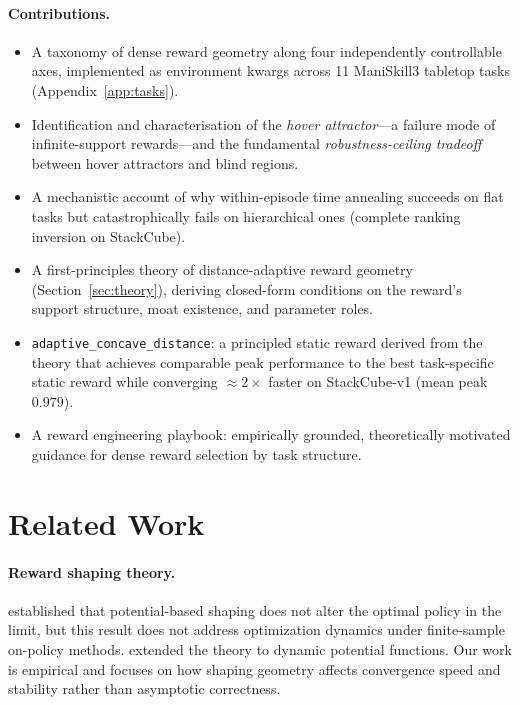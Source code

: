 \documentclass{article}
\begin{document}
\paragraph{Contributions.}
\begin{itemize}
    \item A taxonomy of dense reward geometry along four independently controllable
    axes, implemented as environment kwargs across 11 ManiSkill3 tabletop tasks
    (Appendix~\ref{app:tasks}).
    \item Identification and characterisation of the \emph{hover attractor}---a
    failure mode of infinite-support rewards---and the fundamental
    \emph{robustness-ceiling tradeoff} between hover attractors and blind regions.
    \item A mechanistic account of why within-episode time annealing succeeds on
    flat tasks but catastrophically fails on hierarchical ones (complete ranking
    inversion on StackCube).
    \item A first-principles theory of distance-adaptive reward geometry
    (Section~\ref{sec:theory}), deriving closed-form conditions on the
    reward's support structure, moat existence, and parameter roles.
    \item \texttt{adaptive\_concave\_distance}: a principled static reward derived
    from the theory that achieves comparable peak performance to the best
    task-specific static reward while converging $\approx\!2\times$ faster on
    StackCube-v1 (mean peak $0.979$).
    \item A reward engineering playbook: empirically grounded, theoretically
    motivated guidance for dense reward selection by task structure.
\end{itemize}

\section{Related Work}
\label{sec:related}

\paragraph{Reward shaping theory.}
\citet{ng1999shaping} established that potential-based shaping does not alter the
optimal policy in the limit, but this result does not address optimization dynamics
under finite-sample on-policy methods. \citet{devlin2012potential} extended the theory
to dynamic potential functions. Our work is empirical and focuses on how shaping
geometry affects convergence speed and stability rather than asymptotic correctness.
\end{document}
